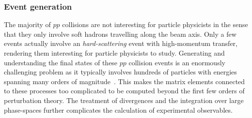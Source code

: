 \subsubsection{Event generation}

The majority of $pp$ collisions are not interesting for particle physicists in the sense that they only involve soft hadrons travelling along the beam axis. Only a few events actually involve an \textit{hard-scattering} event with high-momentum transfer, rendering them interesting for particle physicists to study. Generating and understanding the final states of these $pp$ collision events is an enormously challenging problem as it typically involves hundreds of particles with energies spanning many orders of magnitude~\cite{Buckley:2011ms}. This makes the matrix elements connected to these processes too complicated to be computed beyond the first few orders of perturbation theory. The treatment of divergences and the integration over large phase-spaces further complicates the calculation of experimental observables.

